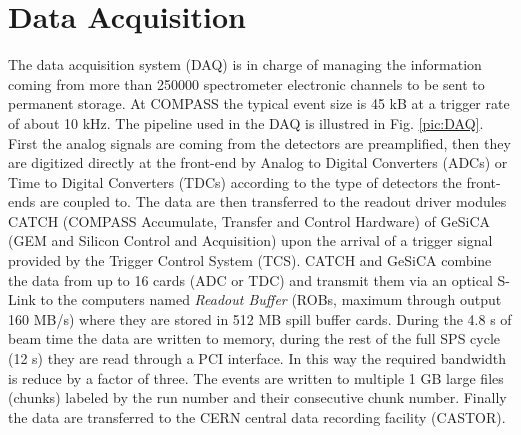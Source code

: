 
\section{Data Acquisition}

The data acquisition system (DAQ) \cite{} is in charge of managing the information coming from more than 250000 spectrometer electronic channels to be sent to permanent storage.
At COMPASS the typical event size is 45 kB at a trigger rate of about 10 kHz. The pipeline used in the DAQ is illustred in Fig. \ref{pic:DAQ}. First the analog signals are coming from
the detectors are preamplified, then they are digitized directly at the front-end by Analog to Digital Converters (ADCs) or Time to Digital Converters (TDCs) according to the type
of detectors the front-ends are coupled to. The data are then transferred to the readout driver modules CATCH (COMPASS Accumulate, Transfer and Control Hardware) of GeSiCA (GEM and
Silicon Control and Acquisition) upon the arrival of a trigger signal provided by the Trigger Control System (TCS). CATCH and GeSiCA combine the data from up to 16 cards (ADC or TDC)
and transmit them via an optical S-Link to the computers named \textit{Readout Buffer} (ROBs, maximum through output 160 MB/s) where they are stored in 512 MB spill buffer cards.
During the 4.8 s of beam time the data are written to memory, during the rest of the full SPS cycle (12 s) they are read through a PCI interface. In this way the required bandwidth
is reduce by a factor of three. The events are written to multiple 1 GB large files (chunks) labeled by the run number and their consecutive chunk number. Finally the data are transferred
to the CERN central data recording facility (CASTOR).

